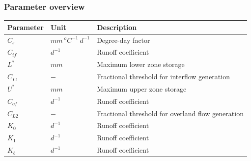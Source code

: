 \subsubsection{Parameter overview}
\begin{table}[htbp]
  \centering
    \begin{tabular}{lll}
    \toprule
    Parameter & Unit  & Description \\
    \midrule
    $C_s$ & $mm~^oC^{-1}~d^{-1}$ & Degree-day factor \\
    $C_{if}$ & $d^{-1}$ & Runoff coefficient \\
    $L^*$ & $mm$  & Maximum lower zone storage \\
    $C_{L1}$ & $-$   & Fractional threshold for interflow generation \\
    $U^*$ & $mm$  & Maximum upper zone storage \\
    $C_{of}$ & $d^{-1}$ & Runoff coefficient \\
    $C_{L2}$ & $-$   & Fractional threshold for overland flow generation \\
    $K_0$ & $d^{-1}$ & Runoff coefficient \\
    $K_1$ & $d^{-1}$ & Runoff coefficient \\
    $K_b$ & $d^{-1}$ & Runoff coefficient \\
    \bottomrule
    \end{tabular}%
  \label{tab:addlabel}%
\end{table}%

